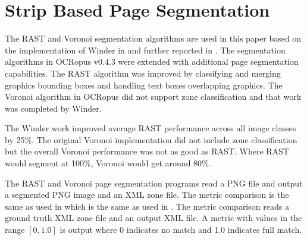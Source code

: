 \documentclass[conference]{IEEEtran}
\begin{document}

\section{Strip Based Page Segmentation}



The RAST and Voronoi segmentation algorithms are used in this paper based on
the implementation of Winder in \cite{winder2010extending} and further reported
in \cite{winder2011icdar}.  The segmentation
algorithms in OCRopus v0.4.3 were extended with
additional page segmentation capabilities. The RAST algorithm was improved by
classifying and merging graphics bounding boxes and handling text boxes
overlapping graphics.  The Voronoi algorithm in OCRopus did not support zone
classification and that work was completed by Winder.

The Winder work improved average RAST performance across all image classes by
25\%. The original Voronoi implementation did not include zone classification
but the overall Voronoi performance was not as good as RAST. Where RAST would
segment at 100\%, Voronoi would get around 80\%.


The RAST and Voronoi page segmentation programs read a PNG file and output a
segmented PNG image and an XML zone file. The metric comparison is the same as
used in \cite{winder2010extending} which is the same as used in
\cite{phillips1999empirical}\cite{antonacopoulos2007page}. The metric comparison
reads a ground truth XML zone file and an output XML file. A metric with values
in the range $[0, 1.0]$ is output where 0 indicates no match and 1.0 indicates
full match. 
\end{document}
